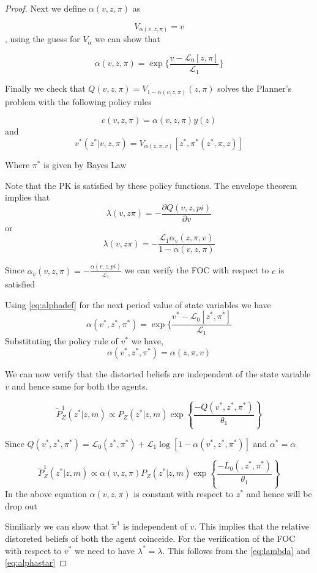 \documentclass[12pt]{article}
\begin{document}
\begin{proof}
\noindent  Next we define $\alpha (v,z, \pi)$ as 

\[V_{\alpha(v,z,\pi)}=v\], using the guess for $V_{\alpha}$ we can show that

\begin{equation}
\alpha (v,z,\pi) = \exp \{ \frac{v-\mathcal{L}_0 [z,\pi]}{ \mathcal{L}_1}\}
\label{eq:alphadef}
\end{equation}


\noindent  Finally we check that $Q(v,z,\pi) = V_{1-\alpha(v,z,\pi)} (z,\pi)$ solves the Planner's problem with the following policy rules

\[c(v,z,\pi)=\alpha (v,z,\pi) y(z)\]
and
\[v^* (z^* | v,z,\pi) = V_{\alpha (z,\pi,v)} [z^*,\pi^*(z^*,\pi,z)]\]

Where $\pi^*$ is given by Bayes Law

\noindent Note that the PK is satisfied by these policy functions. The envelope theorem implies that 
\[\lambda (v,z\pi) = -\frac{\partial Q (v,z,pi)}{\partial v}\]
or 
\begin{equation}
\lambda (v,z\pi) = -\frac{\mathcal{L}_1 \alpha_v(z,\pi,v)}{1-\alpha (v,z,\pi)}
\label{eq:lambda}
\end{equation}

Since $\alpha_v(v,z,\pi) = -\frac{\alpha (v,z,pi)}{\mathcal{L}_1}$ we can verify the FOC with respect to $c$ is satisfied


\noindent Using \ref{eq:alphadef} for the next period value of state variables we have
\[\alpha (v^*,z^*,\pi^*) = \exp \{ \frac{v^*-\mathcal{L}_0 [z^*,\pi^*]}{ \mathcal{L}_1}\]
Substituting the policy rule of $v^*$ we have,
\begin{equation}
\alpha (v^*,z^*,\pi^*) = \alpha (z,\pi,v)
\label{eq:alphastar}
\end{equation}

We can now verify that the distorted beliefs are independent of the state variable $v$ and hence same for both the agents.

\[\tilde{P}^1_Z(z^*|z,m) \propto P_Z(z^*|z,m) \exp \left \{ \frac{-Q(v^*,z^*,\pi^*)}{\theta_1}\right\}\]

Since $Q(v^*,z^*,\pi^*) = \mathcal{L}_0 (z^*,\pi^*) + \mathcal{L}_1 \log[1-\alpha (v^*,z^*,\pi^*)]$ and $\alpha^*=\alpha$

\[\tilde{P}^1_Z(z^*|z,m) \propto \alpha (v,z,\pi)P_Z(z^*|z,m) \exp \left \{ \frac{-L_0(,z^*,\pi^*)}{\theta_1}\right\}\]
In the above equation $\alpha (v,z,\pi)$ is constant with respect to $z^*$ and hence will be drop out

Similiarly we can show that $\tilde{\pi}^1$ is independent of $v$. This implies that the relative distoreted beliefs of both the agent coinceide. For the verification of the FOC with respect to $v^*$ we need to have $\lambda^*=\lambda$. This follows from the \ref{eq:lambda} and \ref{eq:alphastar}

\end{proof}
\end{document}
